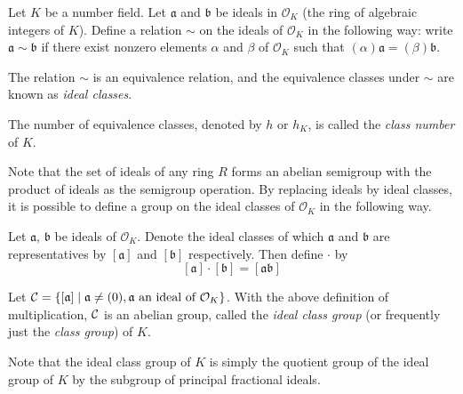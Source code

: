\documentclass[12pt]{article}
\begin{document}
Let $K$ be a number field.  Let $\mathfrak{a}$ and $\mathfrak{b}$ be ideals in $\mathcal{O}_{K}$ (the ring of algebraic integers of $K$).  Define a relation $\sim$ on the ideals of $\mathcal{O}_{K}$ in the following way: write $\mathfrak{a} \sim \mathfrak{b}$ if there exist nonzero elements $\alpha$ and $\beta$ of $\mathcal{O}_K$ such that $(\alpha)\mathfrak{a}=(\beta)\mathfrak{b}$.

The relation $\sim$ is an equivalence relation, and the equivalence classes under $\sim$ are known as {\em ideal classes}.

The number of equivalence classes, denoted by $h$ or $h_K$, is called the {\em class number} of $K$.

Note that the set of ideals of any ring $R$ forms an abelian semigroup with the product of ideals as the semigroup operation.  By replacing ideals by ideal classes, it is possible to define a group on the ideal classes of $\mathcal{O}_{K}$ in the following way.

Let $\mathfrak{a}$, $\mathfrak{b}$ be ideals of $\mathcal{O}_{K}$.  Denote the ideal classes of which $\mathfrak{a}$ and $\mathfrak{b}$ are representatives by $[\mathfrak{a}]$ and $[\mathfrak{b}]$ respectively.  Then define $\cdot$ by \[ [\mathfrak{a}] \cdot [\mathfrak{b}]=[\mathfrak{a} \mathfrak{b}] \]

Let ${\cal C} = \{ [\mathfrak{a}] \mid \mathfrak{a} \neq (0), \mathfrak{a} \text{ an ideal of } \mathcal{O}_{K} \}$.
With the above definition of multiplication, $\cal C$ is an abelian group, called the {\em ideal class group} (or frequently just the \emph{class group}) of $K$.

Note that the ideal class group of $K$ is simply the quotient group of the ideal group of $K$ by the subgroup of principal fractional ideals.
\end{document}
